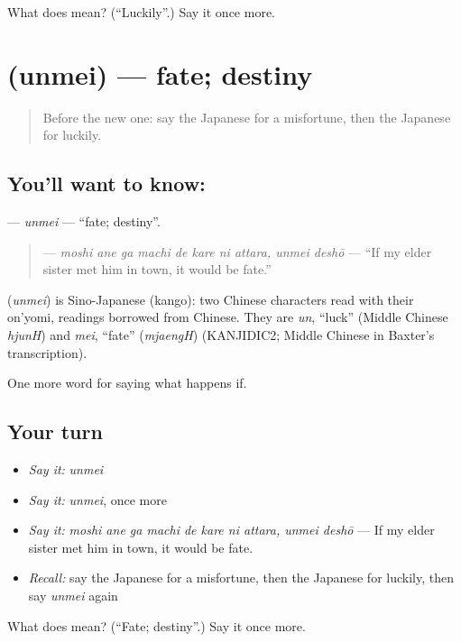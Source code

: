 \begin{tcolorbox}[breakable,colback=teal!4,colframe=teal!35!black,title={Before you move on}]
What does  mean? (\textquotedblleft{}Luckily\textquotedblright{}.) Say it once more.
\end{tcolorbox}
\section[\texorpdfstring{\ja{うんめい} (unmei)}{うんめい (unmei)}]{ (unmei) — fate; destiny}

\label{lesson:JA-C508-unmei}



\begin{quote}
Before the new one: say the Japanese for a misfortune, then the Japanese for luckily.
\end{quote}

\subsection*{You'll want to know: }
\textbf{} — \emph{unmei} — \textquotedblleft{}fate; destiny\textquotedblright{}.

\begin{quote}
\textbf{    } — \emph{moshi ane ga machi de kare ni attara, unmei deshō} — \textquotedblleft{}If my elder sister met him in town, it would be fate.\textquotedblright{}
\end{quote}

\begin{cousinweb}
\textbf{} (\emph{unmei}) is Sino-Japanese (kango): two Chinese characters read with their on'yomi, readings borrowed from Chinese. They are \emph{un}, \textquotedblleft{}luck\textquotedblright{} (Middle Chinese \emph{hjunH}) and \emph{mei}, \textquotedblleft{}fate\textquotedblright{} (\emph{mjaengH}) (KANJIDIC2; Middle Chinese in Baxter's transcription).
\end{cousinweb}

\begin{grammarlens}[title={What you've built}]
One more word for saying what happens if.
\end{grammarlens}

\subsection*{Your turn}
\begin{itemize}
\raggedright
  \item \emph{Say it:} \emph{unmei}
  \item \emph{Say it:} \emph{unmei}, once more
  \item \emph{Say it:} \emph{moshi ane ga machi de kare ni attara, unmei deshō} — If my elder sister met him in town, it would be fate.
  \item \emph{Recall:} say the Japanese for a misfortune, then the Japanese for luckily, then say \emph{unmei} again
\end{itemize}

\begin{tcolorbox}[breakable,colback=teal!4,colframe=teal!35!black,title={Before you move on}]
What does  mean? (\textquotedblleft{}Fate; destiny\textquotedblright{}.) Say it once more.
\end{tcolorbox}
